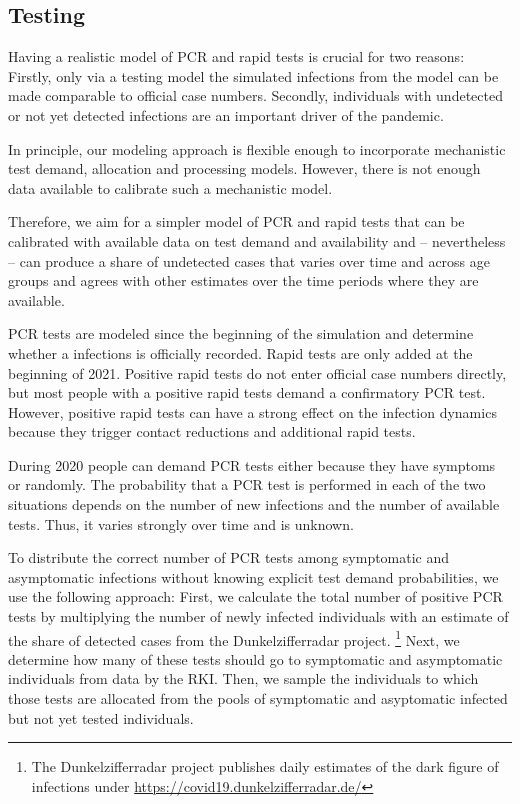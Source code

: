 \subsection{Testing} %
\label{sub:testing}

Having a realistic model of PCR and rapid tests is crucial for two reasons: Firstly,
only via a testing model the simulated infections from the model can be made comparable
to official case numbers. Secondly, individuals with undetected or not yet detected
infections are an important driver of the pandemic.

In principle, our modeling approach is flexible enough to incorporate mechanistic test
demand, allocation and processing models. However, there is not enough data available to
calibrate such a mechanistic model.

Therefore, we aim for a simpler model of PCR and rapid tests that can be calibrated with
available data on test demand and availability and -- nevertheless -- can produce a share
of undetected cases that varies over time and across age groups and agrees with other
estimates over the time periods where they are available.

PCR tests are modeled since the beginning of the simulation and determine whether a
infections is officially recorded. Rapid tests are only added at the beginning of 2021.
Positive rapid tests do not enter official case numbers directly, but most people with a
positive rapid tests demand a confirmatory PCR test. However, positive rapid tests can
have a strong effect on the infection dynamics because they trigger contact reductions
and additional rapid tests.

During 2020 people can demand PCR tests either because they have symptoms or randomly.
The probability that a PCR test is performed in each of the two situations depends on the
number of new infections and the number of available tests. Thus, it varies strongly over
time and is unknown.

To distribute the correct number of PCR tests among symptomatic and asymptomatic
infections without knowing explicit test demand probabilities, we use the following
approach: First, we calculate the total number of positive PCR tests by multiplying the
number of newly infected individuals with an estimate of the share of detected cases from
the Dunkelzifferradar project. \footnote{The Dunkelzifferradar project publishes daily
estimates of the dark figure of infections under
\url{https://covid19.dunkelzifferradar.de/}} Next, we determine how many of these tests
should go to symptomatic and asymptomatic individuals from data by the
RKI. Then, we sample the individuals to which those tests are
allocated from the pools of symptomatic and asyptomatic infected but not yet tested
individuals.

